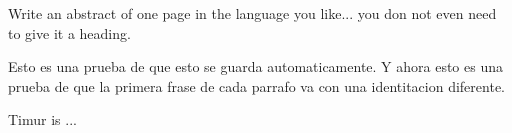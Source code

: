 Write an abstract of one page in the language you like... you don not even 
need to give it a heading.


Esto es una prueba de que esto se guarda automaticamente. Y ahora esto es una prueba de que la primera frase de cada parrafo va con una identitacion diferente.

Timur is ...
